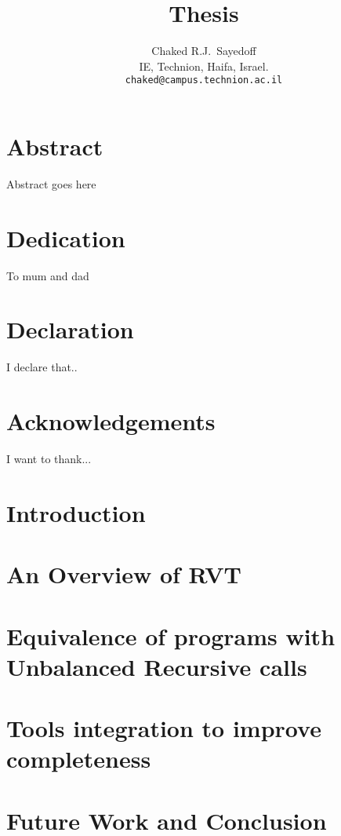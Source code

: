 \documentclass[12pt]{report}
\title{Thesis}
\author{
  Chaked R.J.~Sayedoff \\
  IE, Technion, Haifa, Israel.\\
    \texttt{chaked@campus.technion.ac.il}\\
}
\begin{document}
\maketitle
\chapter*{Abstract}
Abstract goes here

\chapter*{Dedication}
To mum and dad

\chapter*{Declaration}
I declare that..

\chapter*{Acknowledgements}
I want to thank...

\tableofcontents

\chapter{Introduction}


\chapter{An Overview of RVT}


\chapter{Equivalence of programs with Unbalanced Recursive calls}


\chapter{Tools integration to improve completeness}



\chapter{Future Work and Conclusion}






  

\end{document}

